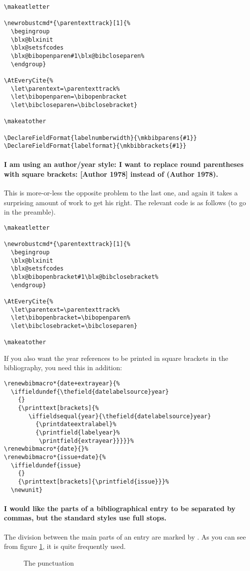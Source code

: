 \begin{Verbatim}
\makeatletter

\newrobustcmd*{\parentexttrack}[1]{%
  \begingroup
  \blx@blxinit
  \blx@setsfcodes
  \blx@bibopenparen#1\blx@bibcloseparen%
  \endgroup}

\AtEveryCite{%
  \let\parentext=\parentexttrack%
  \let\bibopenparen=\bibopenbracket
  \let\bibcloseparen=\bibclosebracket}

\makeatother

\DeclareFieldFormat{labelnumberwidth}{\mkbibparens{#1}}
\DeclareFieldFormat{labelformat}{\mkbibbrackets{#1}}
\end{Verbatim}

\paragraph{I am using an author/year style: I want to replace round
  parentheses with square brackets: [Author 1978] instead of (Author
  1978).} This is more-or-less the opposite problem to the last one,
and again it takes a surprising amount of work to get his right. The
relevant code is as follows (to go in the preamble).
\begin{Verbatim}
\makeatletter

\newrobustcmd*{\parentexttrack}[1]{%
  \begingroup
  \blx@blxinit
  \blx@setsfcodes
  \blx@bibopenbracket#1\blx@bibclosebracket%
  \endgroup}

\AtEveryCite{%
  \let\parentext=\parentexttrack%
  \let\bibopenbracket=\bibopenparen%
  \let\bibclosebracket=\bibcloseparen}

\makeatother
\end{Verbatim}

If you also want the year references to be printed in square brackets
in the bibliography, you need this in addition:
\begin{Verbatim}
\renewbibmacro*{date+extrayear}{%
  \iffieldundef{\thefield{datelabelsource}year}
    {}
    {\printtext[brackets]{%
       \iffieldsequal{year}{\thefield{datelabelsource}year}
         {\printdateextralabel}%
         {\printfield{labelyear}%
          \printfield{extrayear}}}}}%
\renewbibmacro*{date}{}%
\renewbibmacro*{issue+date}{%
  \iffieldundef{issue}
    {}
    {\printtext[brackets]{\printfield{issue}}}%
  \newunit}
\end{Verbatim}

\paragraph{I would like the parts of a bibliographical entry to be
  separated by commas, but the standard styles use full stops.} The
division between the main parts of an entry are marked by
. As you can see from figure \ref{punctcite10}, it is
quite frequently used.
\begin{figure}
\caption{The  punctuation\label{punctcite10}}
\end{figure}

